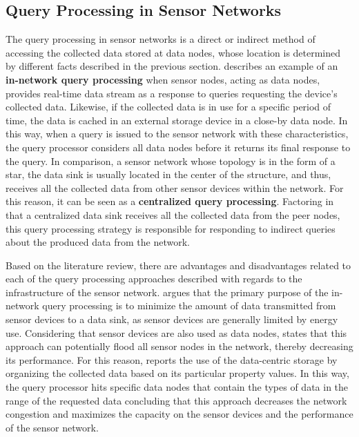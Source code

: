 \subsection{Query Processing in Sensor Networks}
\label{sec:query-process}

The query processing in sensor networks is a direct or indirect method of
accessing the collected data stored at data nodes, whose location is determined
by different facts described in the previous section. \cite{sn-data-centric-storage}
describes an example of an \textbf{in-network query processing} when sensor
nodes, acting as data nodes, provides real-time data stream as a response
to queries requesting the device's collected data. Likewise, if the collected
data is in use for a specific period of time, the data is cached in an external
storage device in a close-by data node. In this way, when a query is issued to
the sensor network with these characteristics, the query processor considers 
all data nodes before it returns its final response to the query. In comparison, a sensor
network whose topology is in the form of a star, the data sink is usually
located in the center of the structure, and thus, receives all
the collected data from other sensor devices within the network. For this reason, it 
can be seen as a \textbf{centralized query processing}. Factoring in that a centralized data
sink receives all the collected data from the peer nodes, this query processing
strategy is responsible for responding to indirect queries about the
produced data from the network. 

Based on the literature review, there are advantages and disadvantages related to
each of the query processing approaches described with regards to the
infrastructure of the sensor network. \cite{sn-data-centric-storage} argues that the 
primary purpose of the in-network query processing is to minimize the amount
of data transmitted from sensor devices to a data sink, as sensor devices are
generally limited by energy use. Considering that sensor devices are also used
as data nodes, \cite{sn-storage04} states that this approach can potentially
flood all sensor nodes in the network, thereby decreasing its performance.
For this reason, \cite{sn-storage01} reports the use of the data-centric
storage by organizing the collected data based on its particular property
values. In this way, the query processor hits specific data nodes that contain
the types of data in the range of the requested data concluding that this approach 
decreases the network congestion and maximizes the
capacity on the sensor devices and the performance of the sensor network.

